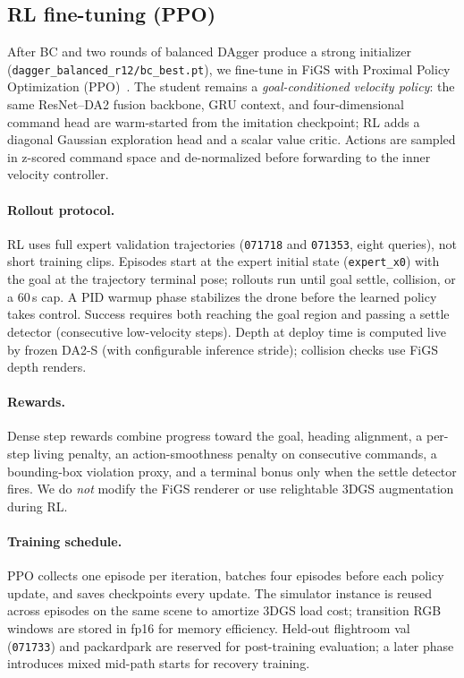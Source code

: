 \documentclass[10pt,twocolumn,letterpaper]{article}
\begin{document}
\subsection{RL fine-tuning (PPO)}
\label{sec:rl}

After BC and two rounds of balanced DAgger produce a strong initializer (\texttt{dagger\_balanced\_r12/bc\_best.pt}), we fine-tune in FiGS with Proximal Policy Optimization (PPO)~\cite{schulman2017proximal}. The student remains a \emph{goal-conditioned velocity policy}: the same ResNet--DA2 fusion backbone, GRU context, and four-dimensional command head are warm-started from the imitation checkpoint; RL adds a diagonal Gaussian exploration head and a scalar value critic. Actions are sampled in z-scored command space and de-normalized before forwarding to the inner velocity controller.

\paragraph{Rollout protocol.} RL uses full expert validation trajectories (\texttt{071718} and \texttt{071353}, eight queries), not short training clips. Episodes start at the expert initial state (\texttt{expert\_x0}) with the goal at the trajectory terminal pose; rollouts run until goal settle, collision, or a 60\,s cap. A PID warmup phase stabilizes the drone before the learned policy takes control. Success requires both reaching the goal region and passing a settle detector (consecutive low-velocity steps). Depth at deploy time is computed live by frozen DA2-S (with configurable inference stride); collision checks use FiGS depth renders.

\paragraph{Rewards.} Dense step rewards combine progress toward the goal, heading alignment, a per-step living penalty, an action-smoothness penalty on consecutive commands, a bounding-box violation proxy, and a terminal bonus only when the settle detector fires. We do \emph{not} modify the FiGS renderer or use relightable 3DGS augmentation during RL.

\paragraph{Training schedule.} PPO collects one episode per iteration, batches four episodes before each policy update, and saves checkpoints every update. The simulator instance is reused across episodes on the same scene to amortize 3DGS load cost; transition RGB windows are stored in fp16 for memory efficiency. Held-out flightroom val (\texttt{071733}) and packardpark are reserved for post-training evaluation; a later phase introduces mixed mid-path starts for recovery training.
\end{document}
